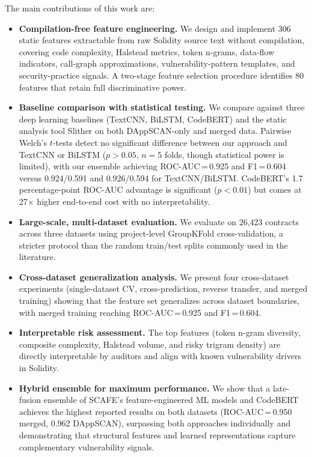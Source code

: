 \documentclass[11pt,a4paper]{article}
\newcommand{\MethodName}{SCAFE\xspace}
\begin{document}
The main contributions of this work are:

\begin{itemize}
    \item \textbf{Compilation-free feature engineering.} We design and implement 306 static features extractable from raw Solidity source text without compilation, covering code complexity, Halstead metrics, token n-grams, data-flow indicators, call-graph approximations, vulnerability-pattern templates, and security-practice signals. A two-stage feature selection procedure identifies 80 features that retain full discriminative power.
    
    \item \textbf{Baseline comparison with statistical testing.} We compare against three deep learning baselines (TextCNN, BiLSTM, CodeBERT) and the static analysis tool Slither on both DAppSCAN-only and merged data. Pairwise Welch's $t$-tests detect no significant difference between our approach and TextCNN or BiLSTM ($p > 0.05$, $n = 5$ folds, though statistical power is limited), with our ensemble achieving ROC-AUC\,=\,0.925 and F1\,=\,0.604 versus 0.924/0.591 and 0.926/0.594 for TextCNN/BiLSTM. CodeBERT's 1.7 percentage-point ROC-AUC advantage is significant ($p < 0.01$) but comes at 27$\times$ higher end-to-end cost with no interpretability.
    
    \item \textbf{Large-scale, multi-dataset evaluation.} We evaluate on 26,423 contracts across three datasets using project-level GroupKFold cross-validation, a stricter protocol than the random train/test splits commonly used in the literature.
    
    \item \textbf{Cross-dataset generalization analysis.} We present four cross-dataset experiments (single-dataset CV, cross-prediction, reverse transfer, and merged training) showing that the feature set generalizes across dataset boundaries, with merged training reaching ROC-AUC\,=\,0.925 and F1\,=\,0.604.
    
    \item \textbf{Interpretable risk assessment.} The top features (token n-gram diversity, composite complexity, Halstead volume, and risky trigram density) are directly interpretable by auditors and align with known vulnerability drivers in Solidity.
    
    \item \textbf{Hybrid ensemble for maximum performance.} We show that a late-fusion ensemble of \MethodName's feature-engineered ML models and CodeBERT achieves the highest reported results on both datasets (ROC-AUC\,=\,0.950 merged, 0.962 DAppSCAN), surpassing both approaches individually and demonstrating that structural features and learned representations capture complementary vulnerability signals.
\end{itemize}
\end{document}
